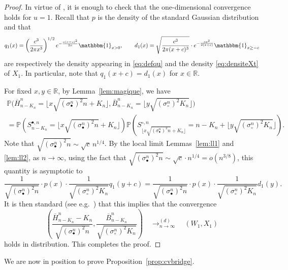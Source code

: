\documentclass[AHL,XML,longabstracts,Unicode]{cedram}
\newcommand{\R}{\mathbb{R}}
\def\scn{\sigma_{\circ}^{n}}
\def\sbn{\sigma_{\bullet}^{n}}
\def\Sbn{S^{\bullet,n}}
\def\Scn{S^{\circ,n}}
\def\oB{\overline{B}}
\def\oH{\overline{H}}
\renewcommand\Pr[1]{\mathbb{P}\left(#1\right)}
\newcommand\Prb[1]{\mathbb{P}\big(#1\big)}
\begin{document}
\begin{proof}
In virtue of \cite[Theorem 16.14]{Kal02}, it is enough to check that the one-dimensional convergence holds for $u=1$. Recall that $p$ is the density of the standard Gaussian distribution and that
\[q_{1}(x)=\left( \frac{ c^{3}}{2 \pi x^{3}} \right)^{1/2} e ^{  - \frac{c (x-c)^{2} }{2x} } \mathbbm{1}_{x>0}, \qquad d_{1}(x) =  \sqrt{ \frac{c^3}{2 \pi (x+c)^{3}}} \cdot e^{- \frac{c x^{2}}{2(x+c)}}  \mathbbm{1}_{x \geq -c}\]
are respectively the density appearing in \eqref{eq:defqu} and the density \eqref{eq:densiteXt} of $X_{1}$. In particular, note that $q_{1}(x+c)=d_{1}(x)$ for $x \in \R$.


For fixed $x,y \in \R$, by Lemma~\ref{lem:magique}, we have
\begin{multline*}
  \Prb{\overline{H}^{n}_{  n-K_{n} }= \lfloor x\sqrt{ (\sbn)^{2} n} +K_{n} \rfloor ,\oB^{n}_{  n-K_{n}}= \lfloor y \sqrt{ (\scn)^{2} K_{n}} \rfloor} \\
=\Pr{ \Sbn_{ n-K_{n} }=  \lfloor x\sqrt{ (\sbn)^{2} n} +K_{n} \rfloor} \Pr{\Scn_{ \lfloor x\sqrt{ (\sbn)^{2} n} +K_{n} \rfloor }= n-K_{n}  + \lfloor y \sqrt{ (\scn)^{2} K_{n}} \rfloor}.
\end{multline*}
Note that $\sqrt{ (\sbn)^{2} n} \sim \sqrt{c} \, n^{1/4}$. By the local limit  Lemmas~\ref{lem:ll1} and \ref{lem:ll2}, as $n \rightarrow \infty$, using the fact that $\sqrt{ (\sbn)^{2} n} \sim \sqrt{c}\cdot n^{1/4}=o(n^{3/8})$, this quantity is asymptotic to
\[ \frac{1}{ \sqrt{ (\sbn)^{2} n}  } \cdot   p \left(x\right)  \cdot  \frac{1}{\sqrt{ (\scn)^{2} K_{n}}} q_{1} \left( y+c \right)=\frac{1}{ \sqrt{ (\sbn)^{2} n}  } \cdot   p \left(x\right)  \cdot  \frac{1}{\sqrt{ (\scn)^{2} K_{n}}} d_{1}(y).\]
It is then standard (see e.g.~\cite[Theorem 7.8]{Bil68}) that this implies that the convergence
  \[ \left(  \frac{\oH^{n}_{   n-K_{n} } -  K_{n} }{\sqrt{ (\sbn)^{2} n} },  \frac{\oB^{n}_{   n-K_{n}  }}{\sqrt{ (\scn)^{2} K_{n}}} \right)  \quad \mathop{\longrightarrow}^{(d)}_{n \rightarrow \infty} \quad  (W_{1},X_{1})\]
  holds in distribution. This completes the proof.\end{proof}






We are now in position to prove Proposition~\ref{prop:cvbridge}.
\end{document}
